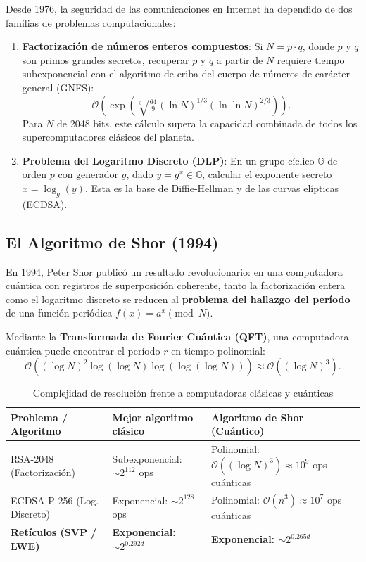 \documentclass[11pt,a4paper,twoside,openright]{book}
\theoremstyle{plain}
\theoremstyle{definition}
\theoremstyle{remark}
\begin{document}
Desde 1976, la seguridad de las comunicaciones en Internet ha dependido de dos familias de problemas computacionales:
\begin{enumerate}
  \item \textbf{Factorizaci\'on de n\'umeros enteros compuestos}: Si $N = p \cdot q$, donde $p$ y $q$ son primos grandes secretos, recuperar $p$ y $q$ a partir de $N$ requiere tiempo subexponencial con el algoritmo de criba del cuerpo de n\'umeros de car\'acter general (GNFS):
  \[
    \mathcal{O}\left( \exp\left( \sqrt[3]{\tfrac{64}{9}} (\ln N)^{1/3} (\ln \ln N)^{2/3} \right) \right).
  \]
  Para $N$ de 2048 bits, este c\'alculo supera la capacidad combinada de todos los supercomputadores cl\'asicos del planeta.
  
  \item \textbf{Problema del Logaritmo Discreto (DLP)}: En un grupo c\'iclico $\mathbb{G}$ de orden $p$ con generador $g$, dado $y = g^x \in \mathbb{G}$, calcular el exponente secreto $x = \log_g(y)$. Esta es la base de Diffie-Hellman y de las curvas el\'ipticas (ECDSA).
\end{enumerate}

\subsection{El Algoritmo de Shor (1994)}

En 1994, Peter Shor public\'o un resultado revolucionario: en una computadora cu\'antica con registros de superposici\'on coherente, tanto la factorizaci\'on entera como el logaritmo discreto se reducen al \textbf{problema del hallazgo del per\'iodo} de una funci\'on peri\'odica $f(x) = a^x \pmod N$.

Mediante la \textbf{Transformada de Fourier Cu\'antica (QFT)}, una computadora cu\'antica puede encontrar el per\'iodo $r$ en tiempo polinomial:
\[
  \mathcal{O}\left( (\log N)^2 \log(\log N) \log(\log(\log N)) \right) \approx \mathcal{O}((\log N)^3).
\]

\begin{table}[H]
\centering
\caption{Complejidad de resoluci\'on frente a computadoras cl\'asicas y cu\'anticas}
\label{tab:comparacion_shor}
\begin{tabular}{lll}
\toprule
\textbf{Problema / Algoritmo} & \textbf{Mejor algoritmo cl\'asico} & \textbf{Algoritmo de Shor (Cu\'antico)} \\
\midrule
RSA-2048 (Factorizaci\'on) & Subexponencial: $\sim 2^{112}$ ops & Polinomial: $\mathcal{O}((\log N)^3) \approx 10^9$ ops cu\'anticas \\
ECDSA P-256 (Log. Discreto) & Exponencial: $\sim 2^{128}$ ops & Polinomial: $\mathcal{O}(n^3) \approx 10^7$ ops cu\'anticas \\
\textbf{Ret\'iculos (SVP / LWE)} & \textbf{Exponencial: $\sim 2^{0.292 d}$} & \textbf{Exponencial: $\sim 2^{0.265 d}$} \\
\bottomrule
\end{tabular}
\end{table}
\end{document}
